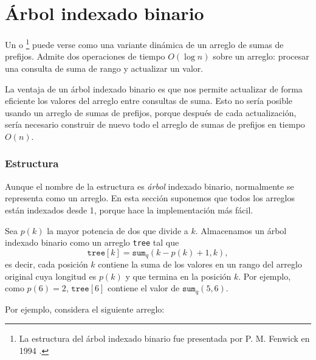 \section{Árbol indexado binario}


Un  o \footnote{La
estructura del árbol indexado binario fue presentada por P. M. Fenwick en 1994 \cite{fen94}.}
puede verse como una variante dinámica de un arreglo de sumas de prefijos.
Admite dos operaciones de tiempo $O(\log n)$ sobre un arreglo:
procesar una consulta de suma de rango y actualizar un valor.

La ventaja de un árbol indexado binario es
que nos permite actualizar de forma eficiente
los valores del arreglo entre consultas de suma.
Esto no sería posible usando un arreglo de sumas de prefijos,
porque después de cada actualización, sería necesario construir de nuevo
todo el arreglo de sumas de prefijos en tiempo $O(n)$.

\subsubsection{Estructura}

Aunque el nombre de la estructura es \emph{árbol} indexado binario,
normalmente se representa como un arreglo.
En esta sección suponemos que todos los arreglos están indexados desde 1,
porque hace la implementación más fácil.

Sea $p(k)$ la mayor potencia de dos que
divide a $k$.
Almacenamos un árbol indexado binario como un arreglo \texttt{tree}
tal que
\[ \texttt{tree}[k] = \texttt{sum}_q(k-p(k)+1,k),\]
es decir, cada posición $k$ contiene la suma de los valores
en un rango del arreglo original cuya longitud es $p(k)$
y que termina en la posición $k$.
Por ejemplo, como $p(6)=2$, $\texttt{tree}[6]$
contiene el valor de $\texttt{sum}_q(5,6)$.

Por ejemplo, considera el siguiente arreglo:
\begin{center}
\end{center}

